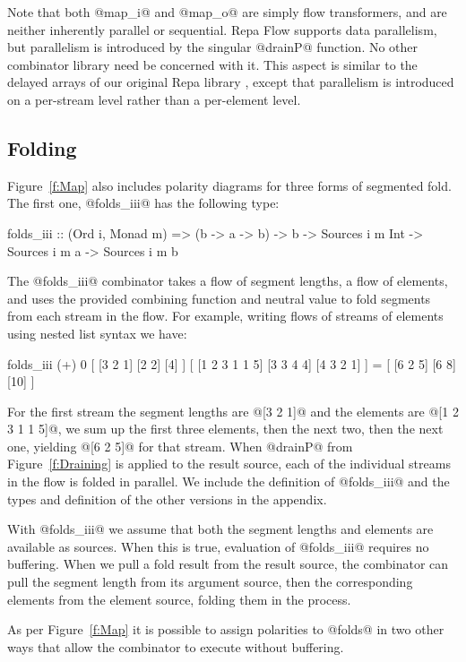 Note that both @map_i@ and @map_o@ are simply flow transformers, and are neither inherently parallel or sequential. Repa Flow supports data parallelism, but parallelism is introduced by the singular @drainP@ function. No other combinator library need be concerned with it. This aspect is similar to the delayed arrays of our original Repa library \cite{Lippmeier:Guiding}, except that parallelism is introduced on a per-stream level rather than a per-element level.


\subsection{Folding}
Figure~\ref{f:Map} also includes polarity diagrams for three forms of segmented fold. The first one, @folds_iii@ has the following type:
\begin{code}
folds_iii :: (Ord i, Monad m) => (b -> a -> b) -> b
          -> Sources i m Int  -> Sources i m a 
          -> Sources i m b
\end{code}

The @folds_iii@ combinator takes a flow of segment lengths, a flow of elements, and uses the provided combining function and neutral value to fold segments from each stream in the flow. For example, writing flows of streams of elements using nested list syntax we have:
\begin{code}
folds_iii (+) 0 
   [ [3 2 1] [2 2] [4] ] 
   [ [1 2 3 1 1 5] [3 3 4 4] [4 3 2 1] ]
 = [ [6 2 5] [6 8] [10] ]
\end{code}

For the first stream the segment lengths are @[3 2 1]@ and the elements are @[1 2 3 1 1 5]@, we sum up the first three elements, then the next two, then the next one, yielding @[6 2 5]@ for that stream. When @drainP@ from Figure~\ref{f:Draining} is applied to the result source, each of the individual streams in the flow is folded in parallel. We include the definition of @folds_iii@ and the types and definition of the other versions in the appendix.

With @folds_iii@ we assume that both the segment lengths and elements are available as sources. When this is true, evaluation of @folds_iii@ requires no buffering. When we pull a fold result from the result source, the combinator can pull the segment length from its argument source, then the corresponding elements from the element source, folding them in the process. 

As per Figure~\ref{f:Map} it is possible to assign polarities to @folds@ in two other ways that allow the combinator to execute without buffering. 

